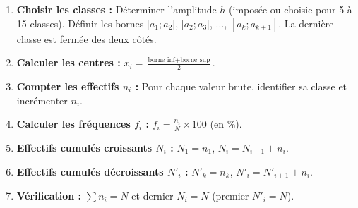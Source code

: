 \documentclass[11pt]{article}
\begin{document}
\begin{methode}
\begin{enumerate}
    \item \textbf{Choisir les classes :} Déterminer l'amplitude $h$ (imposée ou choisie pour 5 à 15 classes). Définir les bornes $[a_1; a_2[$, $[a_2; a_3[$, ..., $[a_k; a_{k+1}]$. La dernière classe est fermée des deux côtés.
    \item \textbf{Calculer les centres :} $x_i = \frac{\text{borne inf} + \text{borne sup}}{2}$.
    \item \textbf{Compter les effectifs $n_i$ :} Pour chaque valeur brute, identifier sa classe et incrémenter $n_i$.
    \item \textbf{Calculer les fréquences $f_i$ :} $f_i = \frac{n_i}{N} \times 100$ (en $\%$).
    \item \textbf{Effectifs cumulés croissants $N_i$ :} $N_1 = n_1$, $N_i = N_{i-1} + n_i$.
    \item \textbf{Effectifs cumulés décroissants $N'_i$ :} $N'_k = n_k$, $N'_i = N'_{i+1} + n_i$.
    \item \textbf{Vérification :} $\sum n_i = N$ et dernier $N_i = N$ (premier $N'_i = N$).
\end{enumerate}
\end{methode}
\end{document}
